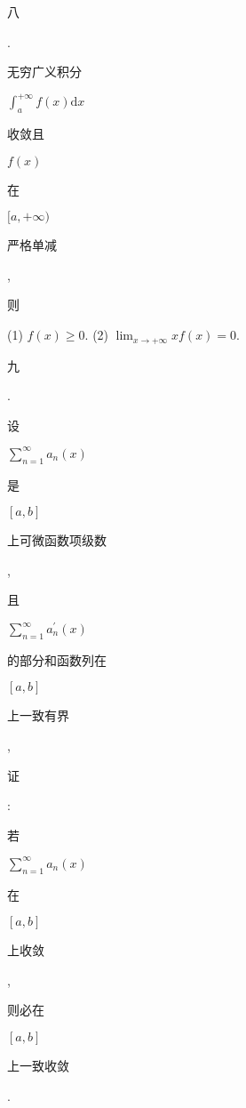 \documentclass[10pt]{article}
\begin{document}
\begin{CJK}{UTF8}{mj}八\end{CJK}. \begin{CJK}{UTF8}{mj}无穷广义积分\end{CJK} $\int_{a}^{+\infty} f(x) \mathrm{d} x$ \begin{CJK}{UTF8}{mj}收敛且\end{CJK} $f(x)$ \begin{CJK}{UTF8}{mj}在\end{CJK} $[a,+\infty)$ \begin{CJK}{UTF8}{mj}严格单减\end{CJK}, \begin{CJK}{UTF8}{mj}则\end{CJK}

(1) $f(x) \geqslant 0$. (2) $\lim _{x \rightarrow+\infty} x f(x)=0$.

\begin{CJK}{UTF8}{mj}九\end{CJK}. \begin{CJK}{UTF8}{mj}设\end{CJK} $\sum_{n=1}^{\infty} a_{n}(x)$ \begin{CJK}{UTF8}{mj}是\end{CJK} $[a, b]$ \begin{CJK}{UTF8}{mj}上可微函数项级数\end{CJK}, \begin{CJK}{UTF8}{mj}且\end{CJK} $\sum_{n=1}^{\infty} a_{n}^{\prime}(x)$ \begin{CJK}{UTF8}{mj}的部分和函数列在\end{CJK} $[a, b]$ \begin{CJK}{UTF8}{mj}上一致有界\end{CJK}, \begin{CJK}{UTF8}{mj}证\end{CJK}: \begin{CJK}{UTF8}{mj}若\end{CJK} $\sum_{n=1}^{\infty} a_{n}(x)$ \begin{CJK}{UTF8}{mj}在\end{CJK} $[a, b]$ \begin{CJK}{UTF8}{mj}上收敛\end{CJK}, \begin{CJK}{UTF8}{mj}则必在\end{CJK} $[a, b]$ \begin{CJK}{UTF8}{mj}上一致收敛\end{CJK}.
\end{document}
